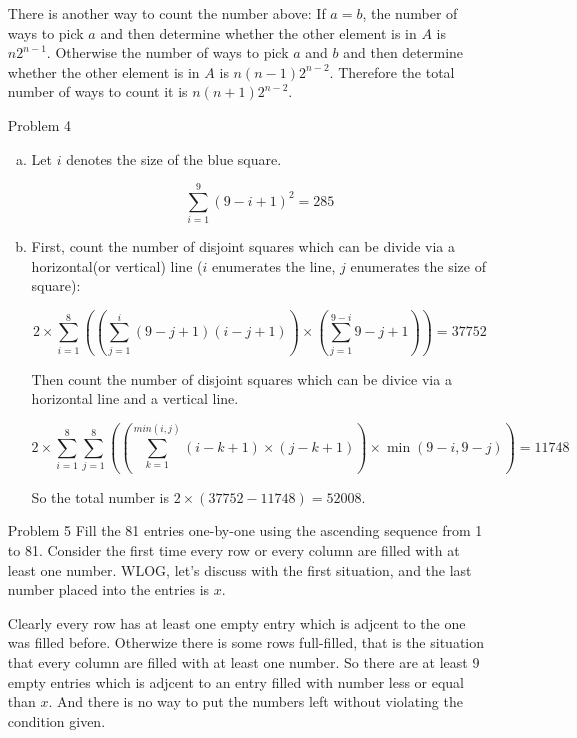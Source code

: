 \documentclass{article}
\begin{document}
\begin{itemize}
        There is another way to count the number above: If $a = b$, the number of ways to pick $a$ and
        then determine whether the other element is in $A$ is $n2^{n-1}$. Otherwise the
        number of ways to pick $a$ and $b$ and then determine whether the other element is in $A$ is 
        $n(n-1)2^{n-2}$. Therefore the total number of ways to count it is $n(n+1)2^{n-2}$.


    \item[Problem 4]
        \begin{enumerate}[(a)]
            \item
                Let $i$ denotes the size of the blue square.

                $$\sum_{i=1}^{9} (9 - i + 1)^2 = 285$$
            \item
                First, count the number of disjoint squares which can be
                divide via a horizontal(or vertical) line ($i$ enumerates the line,
                $j$ enumerates the size of square):
                
                $$2 \times \sum_{i=1}^{8} ((\sum_{j=1}^{i} (9-j+1)(i-j+1)) \times (\sum_{j=1}^{9-i} 9-j+1)) = 37752$$

                Then count the number of disjoint squares which can be divice
                via a horizontal line and a vertical line.

                $$2 \times \sum_{i=1}^{8} \sum_{j=1}^{8} ((\sum_{k=1}^{min(i, j)} (i-k+1)\times(j-k+1)) 
                \times \min(9-i, 9-j)) = 11748$$

                So the total number is $2 \times (37752 - 11748) = 52008$.

        \end{enumerate}

    \item[Problem 5]
        Fill the 81 entries one-by-one using the ascending sequence from 1 to 81.
        Consider the first time every row or every column are filled with at least
        one number. WLOG, let's discuss with the first situation, and the last number
        placed into the entries is $x$.

        Clearly every row has at least one empty entry which is adjcent to the one
        was filled before. Otherwize there is some rows full-filled, that is the situation
        that every column are filled with at least one number. So there are at least
        9 empty entries which is adjcent to an entry filled with number less or equal
        than $x$. And there is no way to put the numbers left without violating the 
        condition given.

\end{itemize}
\end{document}
